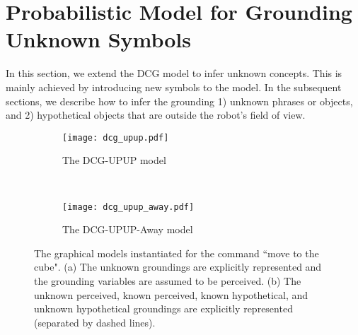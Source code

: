 \section{Probabilistic Model for Grounding Unknown Symbols} \label{sec:technical}

In this section, we extend the DCG model to infer unknown concepts. This is mainly achieved by introducing new symbols to the model. In the subsequent sections, we describe how to infer the grounding 1) unknown phrases or objects, and 2) hypothetical objects that are outside the robot's field of view. %

\begin{figure*}
\centering
\begin{subfigure}[t]{0.40\textwidth}
\centering
\texttt{[image: dcg\_upup.pdf]}
\caption{The DCG-UPUP model}
\label{fig:dcg-upup}
\end{subfigure}
~~~~
\begin{subfigure}[t]{0.52\textwidth}
\centering
\texttt{[image: dcg\_upup\_away.pdf]}
\caption{The DCG-UPUP-Away model}
\label{fig:dcg-upup-away}
\end{subfigure}
\caption{The graphical models instantiated for the command ``{move to the cube}". (a) The unknown groundings are explicitly represented and the grounding variables are assumed to be perceived. (b) The unknown perceived, known perceived, known hypothetical, and unknown hypothetical groundings are explicitly represented (separated by dashed lines).}
\end{figure*}

